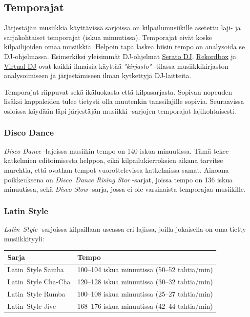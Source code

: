 \documentclass[12pt, a4paper, oneside]{article}
\begin{document}
\subsection{Temporajat}

Järjestäjän musiikkia käyttävissä sarjoissa on kilpailumusiikille asetettu laji- ja sarjakohtaiset temporajat (iskua minuutissa). Temporajat eivät koske kilpailijoiden omaa musiikkia. Helpoin tapa laskea biisin tempo on analysoida se DJ-ohjelmassa. Esimerkiksi yleisimmät DJ-ohjelmat \href{https://serato.com/dj}{Serato DJ}, \href{https://rekordbox.com/}{Rekordbox} ja \href{https://www.virtualdj.com/}{Virtual DJ} ovat kaikki ilmaisia käyttää \textit{"kirjasto"} -tilassa musiikkikirjaston analysoimiseen ja järjestämiseen ilman kytkettyjä DJ-laitteita.

Temporajat riippuvat sekä ikäluokasta että kilpasarjasta. Sopivan nopeuden lisäksi kappaleiden tulee tietysti olla muutenkin tanssilajille sopivia. Seuraavissa osioissa käydään läpi järjestäjän musiikki -sarjojen temporajat lajikohtaisesti.

\subsubsection{Disco Dance}

\textit{Disco Dance} -lajeissa musiikin tempo on 140 iskua minuutissa. Tämä tekee katkelmien editoimisesta helppoa, eikä kilpailukierroksien aikana tarvitse murehtia, että ovathan tempot vuorottelevissa katkelmissa samat. Ainoana poikkeuksena on \textit{Disco~Dance Rising Star} -sarjat, joissa tempo on 136 iskua minuutissa, sekä \textit{Disco Slow} -sarja, jossa ei ole varsinaista temporajaa musiikille.

\subsubsection{Latin Style}

\textit{Latin~Style} -sarjoissa kilpaillaan useassa eri lajissa, joilla jokaisella on oma tietty musiikkityyli: \medskip

\begin{table}[h!]
    \centering
    \setlength\tabcolsep{8mm}
    \renewcommand{\arraystretch}{1.5}
    \begin{tabular}{@{\hspace{0.25cm}}ll@{\hspace{0.25cm}}}
        \toprule
        Sarja               & Tempo                                         \\ \midrule
        Latin~Style Samba   & 100--104 iskua minuutissa (50--52 tahtia/min) \\
        Latin~Style Cha-Cha & 120--128 iskua minuutissa (30--32 tahtia/min) \\
        Latin~Style Rumba   & 100--108 iskua minuutissa (25--27 tahtia/min) \\
        Latin~Style Jive    & 168--176 iskua minuutissa (42--44 tahtia/min) \\ \bottomrule
    \end{tabular}
\end{table}
\end{document}
